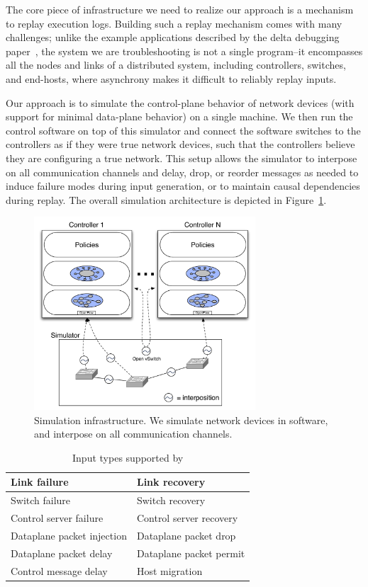The core piece of infrastructure we need to realize our approach is a
mechanism to replay execution logs. Building such a replay mechanism comes
with many challenges; unlike the example applications described
by the delta debugging paper~\cite{Zeller:1999:YMP:318773.318946}, the system we are troubleshooting is not a
single program--it encompasses all the nodes and links of a distributed system,
including controllers, switches, and end-hosts, where asynchrony
makes it difficult to reliably replay inputs.

Our approach is to simulate the control-plane
behavior of network devices (with support for minimal data-plane behavior) on
a single machine. We then run the control software on
top of this simulator and connect the software switches to the controllers as if they were true
network devices, such that the controllers believe they are configuring a true
network. This setup allows the simulator to interpose on all communication
channels and delay, drop, or reorder
messages as needed to induce failure modes during input generation, or to
maintain causal dependencies during replay. The overall
simulation architecture is depicted in
Figure~\ref{fig:architecture}.

\begin{figure}[t]
    \includegraphics[width=3.25in]{../diagrams/architecture/Debugger_Architecture.pdf}
    \caption[]{\label{fig:architecture} Simulation infrastructure. We simulate
    network devices in software, and interpose on all communication
    channels.}
\end{figure}

\begin{table}
\centering
\begin{tabular}{|l|l|}
\hline
Link failure & Link recovery \\
\hline
Switch failure & Switch recovery \\
\hline
Control server failure & Control server recovery \\
\hline
Dataplane packet injection & Dataplane packet drop \\
\hline
Dataplane packet delay & Dataplane packet permit \\
\hline
Control message delay & Host migration \\
\hline
\end{tabular}
\caption{Input types supported by \projectname}
\label{tab:inputs}
\end{table}

